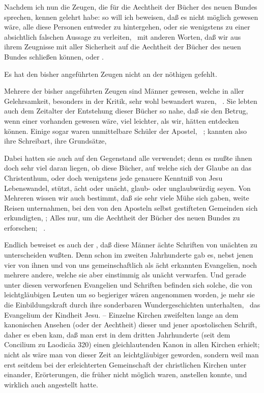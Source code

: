 Nachdem ich nun die Zeugen, die für die Aechtheit der Bücher des neuen Bundes sprechen, kennen gelehrt habe: so will ich beweisen, daß es nicht möglich gewesen wäre, alle diese Personen entweder zu hintergehen, oder sie wenigstens zu einer absichtlich falschen Aussage zu verleiten, \dh\ mit anderen Worten, daß wir aus ihrem Zeugnisse mit aller Sicherheit auf die Aechtheit der Bücher des neuen Bundes schließen können, oder .
\begin{aufza}
\item Es hat den bisher angeführten Zeugen nicht an der nöthigen  gefehlt.
\begin{aufzb}
\item Mehrere der bisher angeführten Zeugen sind Männer gewesen, welche in aller Gelehrsamkeit, besonders in der Kritik, sehr wohl bewandert waren, \zB\ . Sie lebten auch dem Zeitalter der Entstehung dieser Bücher so nahe, daß sie den Betrug, wenn einer vorhanden gewesen wäre, viel leichter, als wir, hätten entdecken können. Einige sogar waren unmittelbare Schüler der Apostel, \zB\ ; kannten also ihre Schreibart, ihre Grundsätze, \usw
\item Dabei hatten sie auch auf den Gegenstand alle  verwendet; denn es mußte ihnen doch sehr viel daran liegen, ob diese Bücher, auf welche sich der Glaube an das Christenthum, oder doch wenigstens jede genauere Kenntniß von Jesu Lebenswandel, stützt, ächt oder unächt, glaub- oder unglaubwürdig seyen. Von Mehreren wissen wir auch bestimmt, daß sie sehr viele Mühe sich gaben, weite Reisen unternahmen, bei den von den Aposteln selbst gestifteten Gemeinden sich erkundigten, \usw ; Alles nur, um die Aechtheit der Bücher des neuen Bundes zu erforschen; \zB\ .~
\item Endlich beweiset es auch der , daß diese Männer ächte Schriften von unächten zu unterscheiden wußten. Denn schon im zweiten Jahrhunderte gab es, nebst jenen vier von ihnen und von uns gemeinschaftlich als ächt erkannten Evangelien, noch mehrere andere, welche sie aber einstimmig als unächt verwarfen. Und gerade unter diesen verworfenen Evangelien und Schriften befinden sich solche, die von leichtgläubigen Leuten um so begieriger wären angenommen worden, je mehr sie die Einbildungskraft durch ihre sonderbaren Wundergeschichten unterhalten, \zB\ das Evangelium der Kindheit Jesu. -- Einzelne Kirchen zweifelten lange an dem kanonischen Ansehen (oder der Aechtheit) dieser und jener apostolischen Schrift, daher es eben kam, daß man erst in dem dritten Jahrhunderte (seit dem Concilium zu Laodicäa 320) einen gleichlautenden Kanon in allen Kirchen erhielt; nicht als wäre man von dieser Zeit an leichtgläubiger geworden, sondern weil man erst seitdem bei der erleichterten Gemeinschaft der christlichen Kirchen unter einander, Erörterungen, die früher nicht möglich waren, anstellen konnte, und wirklich auch angestellt hatte.

\end{aufzb}
\end{aufza}
